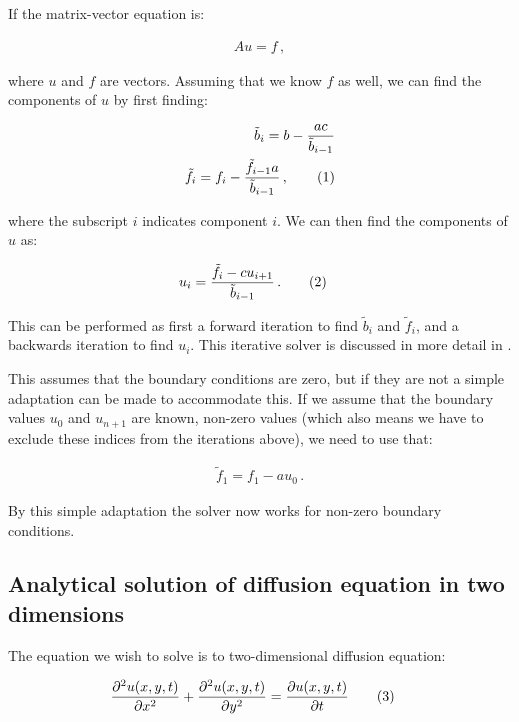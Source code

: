 \documentclass[reprint,english,notitlepage]{revtex4-1}  %
\newcommand\numberthis{\addtocounter{equation}{1}\tag{\theequation}}
\begin{document}
If the matrix-vector equation is:

\begin{align*}
Au = f \, ,
\end{align*}

where $u$ and $f$ are vectors. Assuming that we know $f$ as well, we can find the components of $u$ by first finding:

\begin{align*}
\tilde{b}_i = b - \frac{ac}{\tilde{b}_{i-1}} \\
\tilde{f}_i = f_i - \frac{\tilde{f}_{i-1} a}{\tilde{b}_{i-1}} \, , \numberthis \label{eq:tridiag_forward}
\end{align*}

where the subscript $i$ indicates component $i$. We can then find the components of $u$ as:

\begin{align*}
u_i &= \frac{\tilde{f}_i - c u_{i+1}}{\tilde{b}_{i-1}} \, . \numberthis \label{eq:tridiag_backward}
\end{align*}

This can be performed as first a forward iteration to find $\tilde{b}_i$ and $\tilde{f}_i$, and a backwards iteration to find $u_i$. This iterative solver is discussed in more detail in \citep{Project1}.

This assumes that the boundary conditions are zero, but if they are not a simple adaptation can be made to accommodate this. If we assume that the boundary values $u_0$ and $u_{n+1}$ are known, non-zero values (which also means we have to exclude these indices from the iterations above), we need to use that:

\begin{align*}
\tilde{f}_1 = f_1 - au_0 \, .
\end{align*} 

By this simple adaptation the solver now works for non-zero boundary conditions.



\subsection{Analytical solution of diffusion equation in two dimensions} \label{sec:formalism_2D_diff_eq_analytical}

The equation we wish to solve is to two-dimensional diffusion equation:

\begin{align*}
\frac{\partial^2 u(x,y,t)}{\partial x^2} + \frac{\partial^2 u(x,y,t)}{\partial y^2} &= \frac{\partial u(x,y,t)}{\partial t} \numberthis \label{eq:2D_diffusion_equation}
\end{align*}
\end{document}
